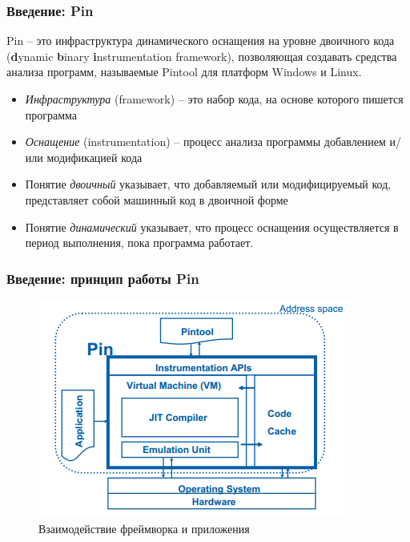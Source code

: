 \documentclass{beamer}
\begin{document}

\begin{frame}
\frametitle{Введение: Pin}
Pin -- это инфраструктура динамического оснащения на уровне двоичного кода (\textbf{d}ynamic \textbf{b}inary \textbf{i}nstrumentation framework), позволяющая создавать средства анализа программ, называемые Pintool для платформ Windows и Linux.
\begin{itemize}
\item \textit{Инфраструктура} (framework) -- это набор кода, на основе которого пишется программа
\item \textit{Оснащение} (instrumentation) -- процесс анализа программы добавлением и/или модификацией кода
\item Понятие \textit{двоичный} указывает, что добавляемый или модифицируемый код, представляет собой машинный код в двоичной форме
\item Понятие \textit{динамический} указывает, что процесс оснащения осуществляется в период выполнения, пока программа работает.
\end{itemize}
\end{frame}



\begin{frame}
\frametitle{Введение: принцип работы Pin}

\begin{figure}
\includegraphics[scale=1]{302144}
\caption{Взаимодействие фреймворка и приложения}
\end{figure}

\end{frame}
\end{document}
